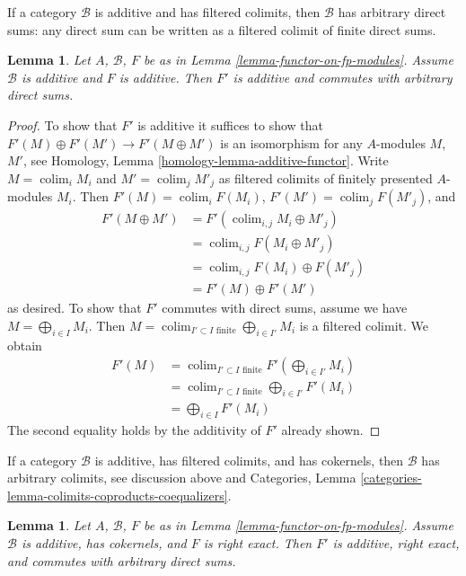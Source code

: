 \documentclass{stacks-project}
\theoremstyle{plain}
\newtheorem{lemma}[subsection]{Lemma}
\theoremstyle{definition}
\theoremstyle{remark}
\numberwithin{equation}{subsection}
\def\colim{\mathop{\mathrm{colim}}\nolimits}
\begin{document}
\noindent
If a category $\mathcal{B}$ is additive and has filtered colimits,
then $\mathcal{B}$ has arbitrary direct sums: any direct sum can be written
as a filtered colimit of finite direct sums.

\begin{lemma}
\label{lemma-functor-on-fp-modules-additive}
Let $A$, $\mathcal{B}$, $F$ be as in Lemma \ref{lemma-functor-on-fp-modules}.
Assume $\mathcal{B}$ is additive and $F$ is additive. Then
$F'$ is additive and commutes with arbitrary direct sums.
\end{lemma}

\begin{proof}
To show that $F'$ is additive it suffices to show
that $F'(M) \oplus F'(M') \to F'(M \oplus M')$ is an isomorphism for
any $A$-modules $M$, $M'$, see
Homology, Lemma \ref{homology-lemma-additive-functor}.
Write $M = \colim_i M_i$ and $M' = \colim_j M'_j$ as filtered colimits
of finitely presented $A$-modules $M_i$. Then
$F'(M) = \colim_i F(M_i)$, $F'(M') = \colim_j F(M'_j)$, and
\begin{align*}
F'(M \oplus M')
& =
F'(\colim_{i, j} M_i \oplus M'_j) \\
& =
\colim_{i, j} F(M_i \oplus M'_j) \\
& =
\colim_{i, j} F(M_i) \oplus F(M'_j) \\
& =
F'(M) \oplus F'(M')
\end{align*}
as desired. To show that $F'$ commutes with direct sums, assume
we have $M = \bigoplus_{i \in I} M_i$. Then
$M = \colim_{I' \subset I\text{ finite}} \bigoplus_{i \in I'} M_i$
is a filtered colimit. We obtain
\begin{align*}
F'(M)
& =
\colim_{I' \subset I\text{ finite}}
F'(\bigoplus\nolimits_{i \in I'} M_i) \\
& =
\colim_{I' \subset I\text{ finite}}
\bigoplus\nolimits_{i \in I'} F'(M_i) \\
& =
\bigoplus\nolimits_{i \in I} F'(M_i)
\end{align*}
The second equality holds by the additivity of $F'$ already shown.
\end{proof}

\noindent
If a category $\mathcal{B}$ is additive, has filtered colimits, and
has cokernels, then $\mathcal{B}$ has arbitrary colimits, see
discussion above and Categories, Lemma
\ref{categories-lemma-colimits-coproducts-coequalizers}.

\begin{lemma}
\label{lemma-functor-on-fp-modules-right-exact}
Let $A$, $\mathcal{B}$, $F$ be as in Lemma \ref{lemma-functor-on-fp-modules}.
Assume $\mathcal{B}$ is additive, has cokernels, and $F$ is right exact. Then
$F'$ is additive, right exact, and commutes with arbitrary direct sums.
\end{lemma}
\end{document}
